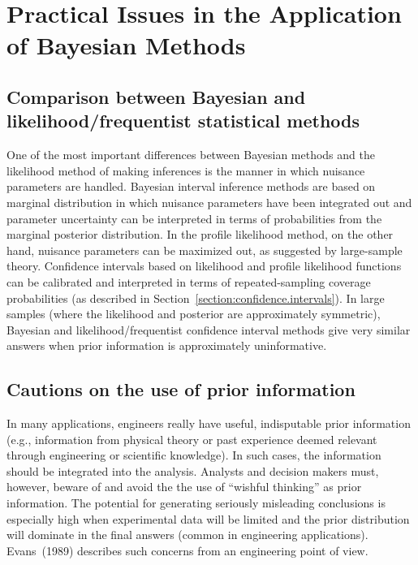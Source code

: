 \section{Practical Issues in the Application of Bayesian Methods}
\subsection{Comparison between Bayesian and 
likelihood/frequentist statistical methods}

One of the most important differences between Bayesian methods and
the likelihood method of making inferences is the manner in which
nuisance parameters are handled.  Bayesian interval inference
methods are based on marginal distribution in which nuisance
parameters have been integrated out and parameter uncertainty can be
interpreted in terms of probabilities from the marginal posterior
distribution.  In the profile likelihood method, on the other hand,
nuisance parameters can be maximized out, as suggested by large-sample
theory.  Confidence intervals based on likelihood and profile
likelihood functions can be calibrated and interpreted in terms of
repeated-sampling coverage probabilities (as described in
Section~\ref{section:confidence.intervals}).  In large samples
(where the likelihood and posterior are approximately symmetric),
Bayesian and likelihood/frequentist confidence interval methods give
very similar answers when prior information is approximately
uninformative.

\subsection{Cautions on the use of prior information}
\label{section:cautions.on.prior}
In many applications, engineers really have useful, indisputable prior
information (e.g., information from physical theory or past experience
deemed relevant through engineering or scientific knowledge). In such
cases, the information should be integrated into the analysis.
Analysts and decision makers must, however, beware of and avoid the
the use of ``wishful thinking'' as prior information.  The potential
for generating seriously misleading conclusions is especially high
when experimental data will be limited and the prior distribution will
dominate in the final answers (common in engineering applications).
Evans~(1989) describes such concerns from an engineering point of
view.

